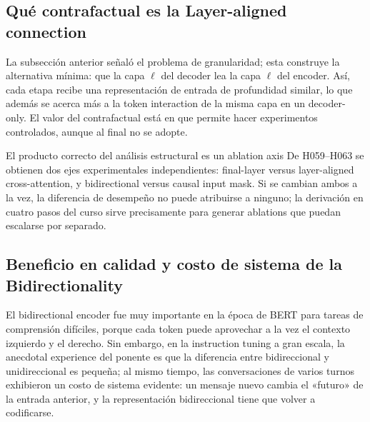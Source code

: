 
\subsection{Qué contrafactual es la Layer-aligned connection}

La subsección anterior señaló el problema de granularidad; esta construye la alternativa mínima: que la capa $\ell$ del decoder lea la capa $\ell$ del encoder. Así, cada etapa recibe una representación de entrada de profundidad similar, lo que además se acerca más a la token interaction de la misma capa en un decoder-only. El valor del contrafactual está en que permite hacer experimentos controlados, aunque al final no se adopte.



\begin{importantbox}{El producto correcto del análisis estructural es un ablation axis}
De H059--H063 se obtienen dos ejes experimentales independientes: final-layer versus layer-aligned cross-attention, y bidirectional versus causal input mask. Si se cambian ambos a la vez, la diferencia de desempeño no puede atribuirse a ninguno; la derivación en cuatro pasos del curso sirve precisamente para generar ablations que puedan escalarse por separado.
\end{importantbox}

\subsection{Beneficio en calidad y costo de sistema de la Bidirectionality}

El bidirectional encoder fue muy importante en la época de BERT para tareas de comprensión difíciles, porque cada token puede aprovechar a la vez el contexto izquierdo y el derecho. Sin embargo, en la instruction tuning a gran escala, la anecdotal experience del ponente es que la diferencia entre bidireccional y unidireccional es pequeña; al mismo tiempo, las conversaciones de varios turnos exhibieron un costo de sistema evidente: un mensaje nuevo cambia el «futuro» de la entrada anterior, y la representación bidireccional tiene que volver a codificarse.

